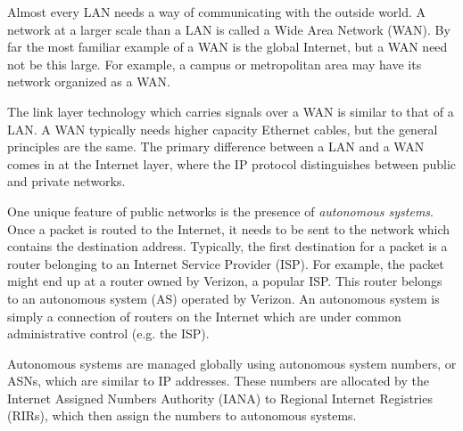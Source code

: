 Almost every LAN needs a way of communicating with the outside world. A network at a larger scale than a LAN is called a Wide Area Network (WAN). By far the most familiar example of a WAN is the global Internet, but a WAN need not be this large. For example, a campus or metropolitan area may have its network organized as a WAN.

The link layer technology which carries signals over a WAN is similar to that of a LAN. A WAN typically needs higher capacity Ethernet cables, but the general principles are the same. The primary difference between a LAN and a WAN comes in at the Internet layer, where the IP protocol distinguishes between public and private networks.

One unique feature of public networks is the presence of \emph{autonomous systems}. Once a packet is routed to the Internet, it needs to be sent to the network which contains the destination address. Typically, the first destination for a packet is a router belonging to an Internet Service Provider (ISP). For example, the packet might end up at a router owned by Verizon, a popular ISP. This router belongs to an autonomous system (AS) operated by Verizon. An autonomous system is simply a connection of routers on the Internet which are under common administrative control (e.g. the ISP).

Autonomous systems are managed globally using autonomous system numbers, or ASNs, which are similar to IP addresses. These numbers are allocated by the Internet Assigned Numbers Authority (IANA) to Regional Internet Registries (RIRs), which then assign the numbers to autonomous systems.


